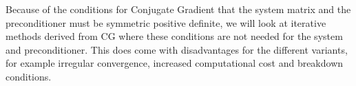 Because of the conditions for Conjugate Gradient that the system matrix and the preconditioner must be symmetric positive definite, we will look at iterative methods derived from CG where these conditions are not needed for the system and preconditioner. This does come with disadvantages for the different variants, for example irregular convergence, increased computational cost and breakdown conditions.